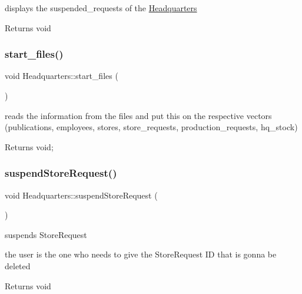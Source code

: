 displays the suspended\+\_\+requests of the \hyperlink{class_headquarters}{Headquarters} 

\begin{DoxyReturn}{Returns}
void 
\end{DoxyReturn}
\mbox{\label{class_headquarters_a55cc9c6aa484bb13d2612baa90098183}} 
\subsubsection{\texorpdfstring{start\+\_\+files()}{start\_files()}}
{\footnotesize\ttfamily void Headquarters\+::start\+\_\+files (\begin{DoxyParamCaption}{ }\end{DoxyParamCaption})}



reads the information from the files and put this on the respective vectors (publications, employees, stores, store\+\_\+requests, production\+\_\+requests, hq\+\_\+stock) 

\begin{DoxyReturn}{Returns}
void; 
\end{DoxyReturn}
\mbox{\label{class_headquarters_aa81365ae7d4af8d3c7e5c8326a72c6f9}} 
\subsubsection{\texorpdfstring{suspend\+Store\+Request()}{suspendStoreRequest()}}
{\footnotesize\ttfamily void Headquarters\+::suspend\+Store\+Request (\begin{DoxyParamCaption}{ }\end{DoxyParamCaption})}



suspends Store\+Request 

the user is the one who needs to give the Store\+Request ID that is gonna be deleted

\begin{DoxyReturn}{Returns}
void 
\end{DoxyReturn}
\mbox{\label{class_headquarters_ab7df8d8638c00305dcaa5593a7dd55ff}} 
